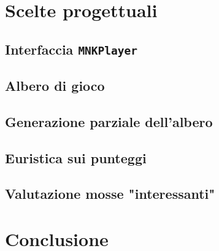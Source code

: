 \documentclass[11pt]{article}
\begin{document}
\section{Scelte progettuali}
\subsection{Interfaccia \texttt{MNKPlayer}}
\subsection{Albero di gioco}
\subsection{Generazione parziale dell'albero}
\subsection{Euristica sui punteggi}
\subsection{Valutazione mosse "interessanti"}
\section{Conclusione}
\end{document}

